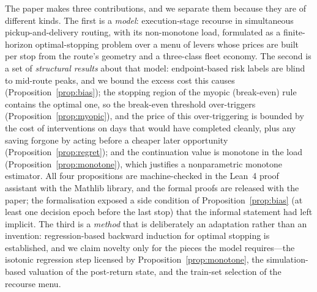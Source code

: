 \documentclass[preprint,authoryear,12pt]{elsarticle}
\theoremstyle{definition}
\theoremstyle{remark}
\begin{document}
The paper makes three contributions, and we separate them because they
are of different kinds. The first is a \emph{model}: execution-stage
recourse in simultaneous pickup-and-delivery routing, with its
non-monotone load, formulated as a finite-horizon optimal-stopping
problem over a menu of levers whose prices are built per stop from the
route's geometry and a three-class fleet economy. The second is a set
of \emph{structural results} about that model: endpoint-based risk labels
are blind to mid-route peaks, and we bound the excess cost this causes
(Proposition~\ref{prop:bias}); the stopping region of the myopic
(break-even) rule contains the optimal one, so the break-even threshold
over-triggers (Proposition~\ref{prop:myopic}), and the price of this
over-triggering is bounded by the cost of interventions on days that
would have completed cleanly, plus any saving forgone by acting before a
cheaper later opportunity (Proposition~\ref{prop:regret}); and the continuation
value is monotone in the load (Proposition~\ref{prop:monotone}), which
justifies a nonparametric monotone estimator. All four propositions are
machine-checked in the Lean~4 proof assistant with the Mathlib library,
and the formal proofs are released with the paper; the formalisation
exposed a side condition of Proposition~\ref{prop:bias} (at least one
decision epoch before the last stop) that the informal statement had
left implicit. The third is a
\emph{method} that is deliberately an adaptation rather than an
invention: regression-based backward induction for optimal stopping
\citep{longstaff2001valuing,tsitsiklis2001regression,clement2002analysis}
is established, and we claim novelty only for the pieces the model
requires---the isotonic regression step licensed by
Proposition~\ref{prop:monotone}, the simulation-based valuation of the
post-return state, and the train-set selection of the recourse menu.
\end{document}
